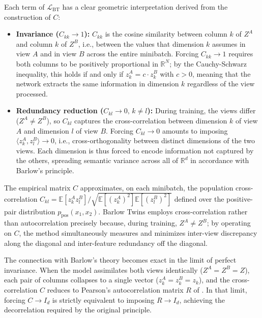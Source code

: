 \documentclass[11pt, oneside, openany]{book}
\begin{document}
Each term of $\mathcal{L}_{\text{BT}}$ has a clear geometric interpretation derived from the construction of $C$:
\begin{itemize}
    \item \textbf{Invariance ($C_{kk} \to 1$):} $C_{kk}$ is the cosine similarity between column $k$ of $Z^{A}$ and column $k$ of $Z^{B}$, i.e., between the values that dimension $k$ assumes in view $A$ and in view $B$ across the entire minibatch. Forcing $C_{kk} \to 1$ requires both columns to be positively proportional in $\mathbb{R}^{N}$; by the Cauchy-Schwarz inequality, this holds if and only if $z_{k}^{A} = c \cdot z_{k}^{B}$ with $c > 0$, meaning that the network extracts the same information in dimension $k$ regardless of the view processed.
    \item \textbf{Redundancy reduction ($C_{kl} \to 0, \, k \neq l$):} During training, the views differ ($Z^{A} \neq Z^{B}$), so $C_{kl}$ captures the cross-correlation between dimension $k$ of view $A$ and dimension $l$ of view $B$. Forcing $C_{kl} \to 0$ amounts to imposing $\langle z_{k}^{A}, z_{l}^{B} \rangle \to 0$, i.e., cross-orthogonality between distinct dimensions of the two views. Each dimension is thus forced to encode information not captured by the others, spreading semantic variance across all of $\mathbb{R}^{d}$ in accordance with Barlow's principle.
\end{itemize}

The empirical matrix $C$ approximates, on each minibatch, the population cross-correlation $C_{kl} = \mathbb{E}[z_{k}^{A} z_{l}^{B}] / \sqrt{\mathbb{E}[(z_{k}^{A})^{2}]\mathbb{E}[(z_{l}^{B})^{2}]}$ defined over the positive-pair distribution $p_{\text{pos}}(x_{1}, x_{2})$. Barlow Twins employs cross-correlation rather than autocorrelation precisely because, during training, $Z^{A} \neq Z^{B}$; by operating on $C$, the method simultaneously measures and minimizes inter-view discrepancy along the diagonal and inter-feature redundancy off the diagonal.

The connection with Barlow's theory becomes exact in the limit of perfect invariance. When the model assimilates both views identically ($Z^{A} = Z^{B} = Z$), each pair of columns collapses to a single vector ($z_{k}^{A} = z_{k}^{B} = z_{k}$), and the cross-correlation $C$ reduces to Pearson's autocorrelation matrix $R$ of . In that limit, forcing $C \to I_{d}$ is strictly equivalent to imposing $R \to I_{d}$, achieving the decorrelation required by the original principle.
\end{document}
